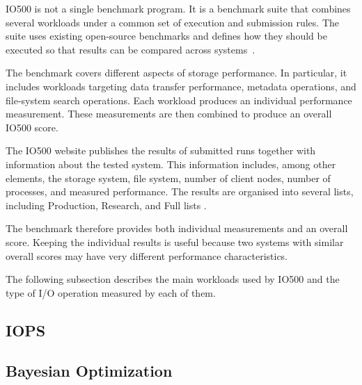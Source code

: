 IO500 is not a single benchmark program. It is a benchmark suite that
combines several workloads under a common set of execution and
submission rules. The suite uses existing open-source benchmarks and
defines how they should be executed so that results can be compared
across systems~\cite{io500about}.

The benchmark covers different aspects of storage performance. In
particular, it includes workloads targeting data transfer performance,
metadata operations, and file-system search operations. Each workload
produces an individual performance measurement. These measurements are
then combined to produce an overall IO500 score.

The IO500 website publishes the results of submitted runs together with
information about the tested system. This information includes, among
other elements, the storage system, file system, number of client nodes,
number of processes, and measured performance. The results are organised
into several lists, including Production, Research, and Full lists
\cite{io500list}.

The benchmark therefore provides both individual measurements and an
overall score. Keeping the individual results is useful because two
systems with similar overall scores may have very different performance
characteristics.

The following subsection describes the main workloads used by IO500 and
the type of I/O operation measured by each of them.
\subsection{IOPS}
\subsection{Bayesian Optimization}